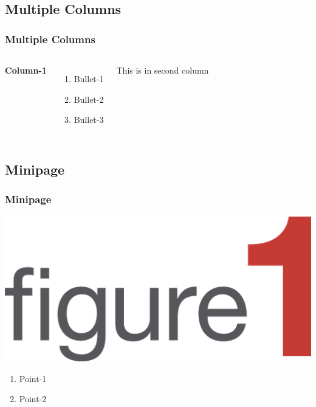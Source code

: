 \documentclass[table,10pt,red]{beamer}	%
\begin{document}
\subsection{Multiple Columns} %
\begin{frame}
\frametitle{Multiple Columns}
\begin{columns}[c] %

\textbf{Column-1 }
\begin{enumerate}
\item Bullet-1
\item Bullet-2
\item Bullet-3
\end{enumerate}

This is in second column

\end{columns}
\end{frame}

\subsection{Minipage} %
\begin{frame}
	\frametitle{Minipage} \pause
		\begin{minipage}[c]{0.4\textwidth}
			\includegraphics[width=\linewidth]{figure_1}
		\end{minipage}
	\pause
	\hfill
		\begin{minipage}[c]{0.5\textwidth}
			\begin{enumerate}
				\item <+-|alert@+> Point-1
				\item <+-|alert@+> Point-2
			\end{enumerate}
		\end{minipage}   
\end{frame}
\end{document}

